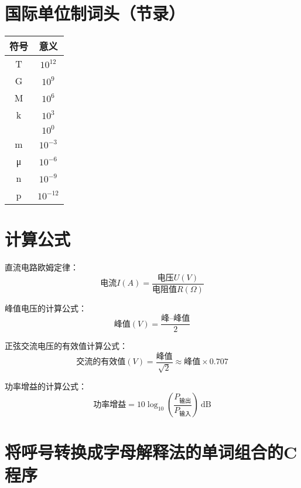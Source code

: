 \newpage



\section{国际单位制词头（节录）}

\begin{longtable}{|c|c|}
	\hline
	\textbf{符号} & \textbf{意义} \\
	\hline
	T & $10^{12}$ \\
	\hline
	G & $10^{9}$ \\
	\hline
	M & $10^{6}$ \\
	\hline
	k & $10^{3}$ \\
	\hline
	 & $10^{0}$ \\
	\hline
	m & $10^{-3}$ \\
	\hline
	μ & $10^{-6}$ \\
	\hline
	n & $10^{-9}$ \\
	\hline
	p & $10^{-12}$ \\
	\hline
\end{longtable}

\newpage

\section{计算公式}

直流电路欧姆定律：
$$\mbox{电流}I(A)=\frac{\mbox{电压}U(V)}{\mbox{电阻值}R(\Omega)}$$

峰值电压的计算公式：
$$\mbox{峰值}(V)=\frac{\mbox{峰--峰值}}{2}$$

正弦交流电压的有效值计算公式：
$$\mbox{交流的有效值}(V)=\frac{\mbox{峰值}}{\sqrt{2}} \approx \mbox{峰值}\times0.707$$

功率增益的计算公式：
$$\mbox{功率增益}=10 \log_{10} \left( {\frac{P_{ \mbox{输出} }}{P_{ \mbox{输入} }}}\right)\ \mathrm{dB}$$



\newpage



\section{将呼号转换成字母解释法的单词组合的C程序}

